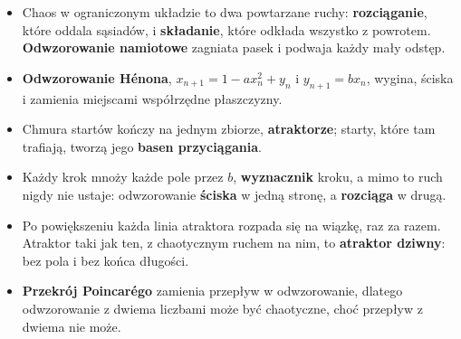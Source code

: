 \begin{summarybox}
\begin{itemize}
\item Chaos w ograniczonym układzie to dwa powtarzane ruchy:
  \textbf{rozciąganie}, które oddala sąsiadów, i \textbf{składanie}, które
  odkłada wszystko z powrotem. \textbf{Odwzorowanie namiotowe} zagniata pasek
  i podwaja każdy mały odstęp.
\item \textbf{Odwzorowanie Hénona}, $x_{n+1} = 1 - a x_n^{2} + y_n$ i
  $y_{n+1} = b x_n$, wygina, ściska i zamienia miejscami współrzędne
  płaszczyzny.
\item Chmura startów kończy na jednym zbiorze, \textbf{atraktorze}; starty,
  które tam trafiają, tworzą jego \textbf{basen przyciągania}.
\item Każdy krok mnoży każde pole przez $b$, \textbf{wyznacznik} kroku, a mimo
  to ruch nigdy nie ustaje: odwzorowanie \textbf{ściska} w jedną stronę, a
  \textbf{rozciąga} w drugą.
\item Po powiększeniu każda linia atraktora rozpada się na wiązkę, raz za
  razem. Atraktor taki jak ten, z chaotycznym ruchem na nim, to
  \textbf{atraktor dziwny}: bez pola i bez końca długości.
\item \textbf{Przekrój Poincarégo} zamienia przepływ w odwzorowanie, dlatego
  odwzorowanie z dwiema liczbami może być chaotyczne, choć przepływ z dwiema
  nie może.
\end{itemize}
\end{summarybox}

\canyou

